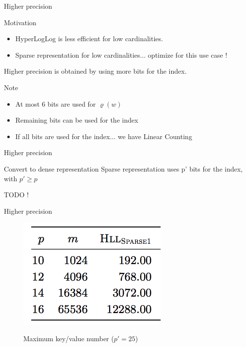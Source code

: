 \documentclass{beamer}
\begin{document}


\begin{frame}{Higher precision}


\begin{block}{Motivation}
\begin{itemize}
\item HyperLogLog is less efficient for low cardinalities. 
\item Sparse representation for low cardinalities... optimize for this use case !
\end{itemize}
\end{block}

Higher precision is obtained by using more bits for the index. 

\begin{block}{Note}
\begin{itemize} 
\item At most 6 bits are used for $\varrho(w)$
\item Remaining bits can be used for the index
\item If all bits are used for the index... we have Linear Counting
\end{itemize}
\end{block}

\end{frame}



\begin{frame}{Higher precision}


\begin{block}{Convert to dense representation}
Sparse representation uses p' bits for the index, with $p' \ge p$

TODO !
\end{block}

\end{frame}

\begin{frame}{Higher precision}


\begin{figure}[c]
\includegraphics [scale=0.45]  {sparse1.png}

Maximum key/value number ($p' = 25$)
\end{figure}

\end{frame}
\end{document}
